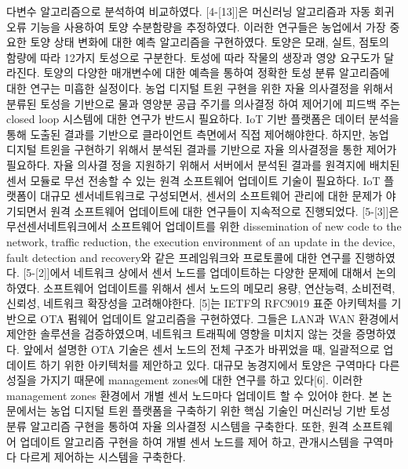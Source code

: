 \documentclass[11pt]{article}
\begin{document}
다변수 알고리즘으로 분석하여 비교하였다. [4-[13]]은 머신러닝 알고리즘과 자동 회귀 오류 기능을 사용하여 토양 수분함량을 추정하였다. 이러한 연구들은 농업에서 가장 중요한 토양 상태 변화에 대한 예측 알고리즘을 구현하였다. 토양은 모래, 실트, 점토의 함량에 따라 12가지 토성으로 구분한다. 토성에 따라 작물의 생장과 영양 요구도가 달라진다. 토양의 다양한 매개변수에 대한 예측을 통하여 정확한 토성 분류 알고리즘에 대한 연구는 미흡한 실정이다. 농업 디지털 트윈 구현을 위한 자율 의사결정을 위해서 분류된 토성을 기반으로 물과
영양분 공급 주기를 의사결정 하여 제어기에 피드백 주는 closed loop 시스템에 대한 연구가 반드시 필요하다.
IoT 기반 플랫폼은 데이터 분석을 통해 도출된 결과를 기반으로 클라이언트 측면에서 직접 제어해야한다. 하지만, 농업 디지털 트윈을 구현하기 위해서 분석된 결과를 기반으로 자율 의사결정을 통한 제어가 필요하다. 자율 의사결 정을 지원하기 위해서 서버에서 분석된 결과를 원격지에 배치된 센서 모듈로 무선 전송할 수 있는 원격 소프트웨어 업데이트 기술이 필요하다. IoT 플랫폼이 대규모 센서네트워크로 구성되면서, 센서의 소프트웨어 관리에 대한 문제가 야기되면서 원격 소프트웨어 업데이트에 대한 연구들이 지속적으로 진행되었다.
[5-[3]]은 무선센서네트워크에서 소프트웨어 업데이트를 위한 dissemination of new code to the network, traffic reduction, the execution environment of an update in the device, fault detection and recovery와 같은 프레임워크와 프로토콜에 대한 연구를 진행하였다. [5-[2]]에서 네트워크 상에서 센서 노드를
업데이트하는 다양한 문제에 대해서 논의하였다. 소프트웨어 업데이트를 위해서 센서 노드의 메모리 용량, 연산능력, 소비전력, 신뢰성, 네트워크 확장성을 고려해야한다. [5]는 IETF의 RFC9019 표준 아키텍처를 기반으로 OTA 펌웨어 업데이트 알고리즘을 구현하였다. 그들은 LAN과 WAN 환경에서 제안한 솔루션을 검증하였으며, 네트워크 트래픽에 영향을 미치지 않는 것을 증명하였다. 앞에서 설명한 OTA 기술은 센서 노드의 전체 구조가 바뀌었을 때, 일괄적으로 업데이트 하기 위한 아키텍처를 제안하고 있다. 대규모 농경지에서 토양은 구역마다 다른 성질을 가지기 때문에 management zones에 대한 연구를 하고 있다[6]. 이러한 management zones 환경에서 개별 센서 노드마다 업데이트 할 수 있어야 한다. 본 논문에서는 농업 디지털 트윈 플랫폼을 구축하기 위한 핵심 기술인 머신러닝 기반 토성 분류 알고리즘 구현을 통하여 자율 의사결정 시스템을 구축한다. 또한, 원격 소프트웨어 업데이트 알고리즘 구현을 하여 개별 센서 노드를 제어
하고, 관개시스템을 구역마다 다르게 제어하는 시스템을 구축한다.
\end{document}
